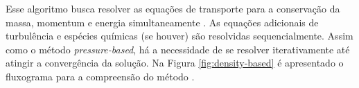 Esse algoritmo busca resolver as equações de transporte para a conservação da massa, momentum e energia simultaneamente \cite{Weiss1995PreconditioningAT, Weiss1997IMPLICITSO, Weiss1999ImplicitSO}. As equações adicionais de turbulência e espécies químicas (se houver) são resolvidas sequencialmente. Assim como o método \textit{pressure-based}, há a necessidade de se resolver iterativamente até atingir a convergência da solução. Na Figura \ref{fig:density-based} é apresentado o fluxograma para a compreensão do método \cite{fluent2021ansys}.

\begin{figure}[!ht]
    \centering


\begin{tikzpicture}[x=0.75pt,y=0.75pt,yscale=-1,xscale=1]


\end{tikzpicture}
\end{figure}
